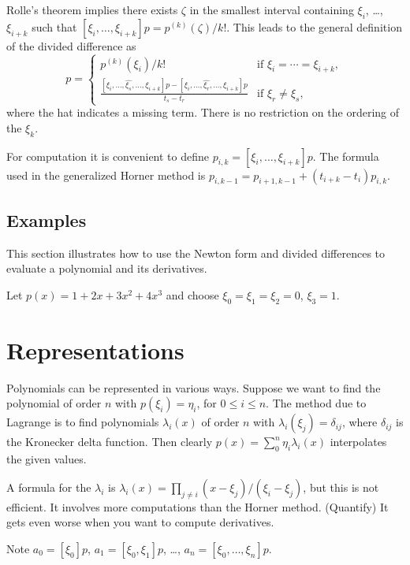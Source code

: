 \documentclass[11pt,fleqn]{article}
\begin{document}
Rolle's theorem implies there exists $\zeta$
in the smallest interval containing $\xi_i$, \dots, $\xi_{i+k}$
such that $[\xi_i,\dots,\xi_{i+k}]p = p^{(k)}(\zeta)/k!$.
This leads to the general definition of the divided difference as
\begin{equation}
[\xi_i,\dots,\xi_{i+k}]p =
	\begin{cases}
		p^{(k)}(\xi_i)/k! & \text{if $\xi_i = \cdots = \xi_{i+k}$},\\
		\displaystyle{
		 \frac{[\xi_{i},\dots,\hat{\xi_{s}},\dots,\xi_{i+k}]p
		 - [\xi_{i},\dots,\hat{\xi_{r}},\dots,\xi_{i+k}]p}{t_s - t_r}}
		& \text{if $\xi_r \not= \xi_s$,}
	\end{cases}
\end{equation}
where the hat indicates a missing term. There is no restriction on
the ordering of the $\xi_k$.

For computation it is convenient to define
$p_{i,k} = [\xi_i,\dots,\xi_{i+k}]p$. The formula used in the
generalized Horner method is
$p_{i,k-1} = p_{i+1,k-1} + (t_{i+k} - t_i)p_{i,k}$.

\subsection{Examples}
This section illustrates how to use the Newton form
and divided differences to evaluate a polynomial and its derivatives.

Let $p(x) = 1 + 2x + 3x^2 + 4x^3$ and choose $\xi_0 = \xi_1 = \xi_2 = 0$,
$\xi_3 = 1$.

\section{Representations}
Polynomials can be represented in various ways. Suppose we want to find
the polynomial of order $n$ with $p(\xi_i) = \eta_i$, for $0 \le i \le
n$. The method due to Lagrange is to find polynomials $\lambda_i(x)$
of order $n$ with
$\lambda_i(\xi_j) = \delta_{ij}$, where $\delta_{ij}$ is the Kronecker
delta function. Then clearly $p(x) = \sum_0^n \eta_i\lambda_i(x)$
interpolates the given values.

A formula for the $\lambda_i$ is $\lambda_i(x) = \prod_{j\not=i}(x -
\xi_j)/(\xi_i - \xi_j)$, but this is not efficient. It involves
more computations than the Horner method. (Quantify) It gets even
worse when you want to compute derivatives.

Note $a_0 = [\xi_0]p$, $a_1 = [\xi_0, \xi_1]p$, \dots,
$a_n = [\xi_0, \dots, \xi_n]p$.
\end{document}
